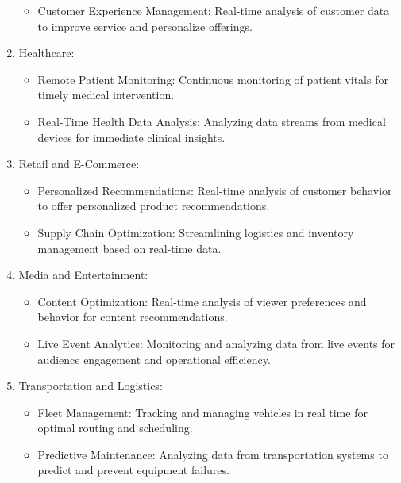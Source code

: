 \documentclass[11pt, reqno]{amsart}
\theoremstyle{definition}
\theoremstyle{remark}
\begin{document}
\begin{enumerate}
\begin{itemize}
        \item Customer Experience Management: Real-time analysis of customer
          data to improve service and personalize offerings.
      \end{itemize}

    \item Healthcare:
      \begin{itemize}
        \item Remote Patient Monitoring: Continuous monitoring of patient vitals
          for timely medical intervention.

        \item Real-Time Health Data Analysis: Analyzing data streams from
          medical devices for immediate clinical insights.
      \end{itemize}

    \item Retail and E-Commerce:
      \begin{itemize}
        \item Personalized Recommendations: Real-time analysis of customer
          behavior to offer personalized product recommendations.

        \item Supply Chain Optimization: Streamlining logistics and inventory
          management based on real-time data.
      \end{itemize}

    \item Media and Entertainment:
      \begin{itemize}
        \item Content Optimization: Real-time analysis of viewer preferences and
          behavior for content recommendations.

        \item Live Event Analytics: Monitoring and analyzing data from live
          events for audience engagement and operational efficiency.
      \end{itemize}

    \item Transportation and Logistics:
      \begin{itemize}
        \item Fleet Management: Tracking and managing vehicles in real time for
          optimal routing and scheduling.

        \item Predictive Maintenance: Analyzing data from transportation systems
          to predict and prevent equipment failures.
      \end{itemize}


\end{enumerate}
\end{document}

